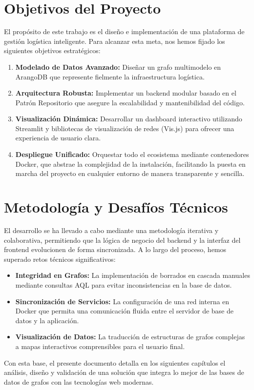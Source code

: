 \section{Objetivos del Proyecto}
El propósito de este trabajo es el diseño e implementación de una plataforma de gestión logística inteligente. Para alcanzar esta meta, nos hemos fijado los siguientes objetivos estratégicos:
\begin{enumerate}
    \item \textbf{Modelado de Datos Avanzado:} Diseñar un grafo multimodelo en ArangoDB que represente fielmente la infraestructura logística.
    \item \textbf{Arquitectura Robusta:} Implementar un backend modular basado en el Patrón Repositorio que asegure la escalabilidad y mantenibilidad del código.
    \item \textbf{Visualización Dinámica:} Desarrollar un dashboard interactivo utilizando Streamlit y bibliotecas de visualización de redes (Vis.js) para ofrecer una experiencia de usuario clara.
    \item \textbf{Despliegue Unificado:} Orquestar todo el ecosistema mediante contenedores Docker, que abstrae la complejidad de la instalación, facilitando la puesta en marcha del proyecto en cualquier entorno de manera transparente y sencilla.
\end{enumerate}

\section{Metodología y Desafíos Técnicos}
El desarrollo se ha llevado a cabo mediante una metodología iterativa y colaborativa, permitiendo que la lógica de negocio del backend y la interfaz del frontend evolucionen de forma sincronizada. A lo largo del proceso, hemos superado retos técnicos significativos:
\begin{itemize}
    \item \textbf{Integridad en Grafos:} La implementación de borrados en cascada manuales mediante consultas AQL para evitar inconsistencias en la base de datos.
    \item \textbf{Sincronización de Servicios:} La configuración de una red interna en Docker que permita una comunicación fluida entre el servidor de base de datos y la aplicación.
    \item \textbf{Visualización de Datos:} La traducción de estructuras de grafos complejas a mapas interactivos comprensibles para el usuario final.
\end{itemize}

Con esta base, el presente documento detalla en los siguientes capítulos el análisis, diseño y validación de una solución que integra lo mejor de las bases de datos de grafos con las tecnologías web modernas.